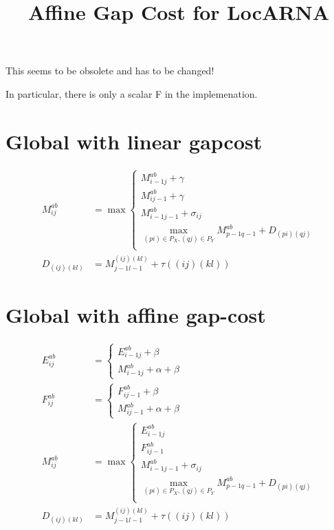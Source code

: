 \documentclass{article}
\title{Affine Gap Cost for LocARNA}
\begin{document}
\maketitle

This seems to be obsolete and has to be changed!

In particular, there is only a scalar F in the implemenation.

\section{Global with linear gapcost}
\begin{align*}
  M^{ab}_{ij} &= 
  \max
  \begin{cases}
    M^{ab}_{i-1j} + \gamma\\
    M^{ab}_{ij-1} + \gamma\\
    M^{ab}_{i-1j-1} + \sigma_{ij}\\
    \max_{(pi)\in P_X,(qj)\in P_Y} M^{ab}_{p-1q-1} + D_{(pi)(qj)}\\
  \end{cases}
  \\
  D_{(ij)(kl)} &= M^{(ij)(kl)}_{j-1l-1} + \tau((ij)(kl))
\end{align*}

\section{Global with affine gap-cost}
\begin{align*}
  E^{ab}_{ij} &= 
  \begin{cases}
    E^{ab}_{i-1j} + \beta\\
    M^{ab}_{i-1j} + \alpha + \beta
  \end{cases}\\
%
  F^{ab}_{ij} &= 
  \begin{cases}
    F^{ab}_{ij-1} + \beta\\
    M^{ab}_{ij-1} + \alpha + \beta
  \end{cases}\\  
%
  M^{ab}_{ij} &= 
  \max
  \begin{cases}
    E^{ab}_{i-1j}\\
    F^{ab}_{ij-1}\\
    M^{ab}_{i-1j-1} + \sigma_{ij}\\
    \max_{(pi)\in P_X,(qj)\in P_Y} M^{ab}_{p-1q-1} + D_{(pi)(qj)}\\
  \end{cases}
  \\
  D_{(ij)(kl)} &= M^{(ij)(kl)}_{j-1l-1} + \tau((ij)(kl))
\end{align*}
\end{document}
